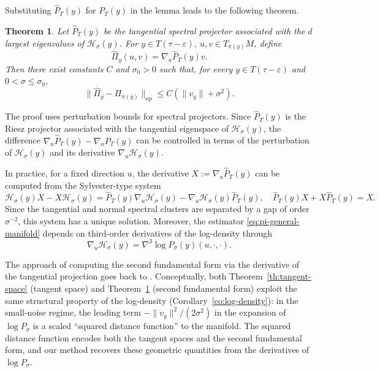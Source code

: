 \documentclass[11pt]{article}
\theoremstyle{plain}
\newtheorem{theorem}{Theorem}[section]
\theoremstyle{definition}
\begin{document}
Substituting $\widehat{P}_T(y)$ for $P_T(y)$ in the lemma leads to the following theorem.
\begin{theorem}\label{th:general-manifold}
Let $\widehat P_T(y)$ be the tangential spectral projector associated with the $d$ largest eigenvalues of $\mathcal H_\sigma(y)$. For $y\in T(\tau-\varepsilon),\ u,v\in T_{\pi(y)}M$, define
\begin{equation}\label{eq:pi-general-manifold}
\widehat{\Pi}_y(u,v) = \nabla_{u} \widehat{P}_T(y) v.
\end{equation}
Then there exist constants $C$ and $\sigma_0>0$ such that, for every $y\in T(\tau-\varepsilon)$ and $0<\sigma\le\sigma_0$,
\[
\|\widehat{\Pi}_y-\Pi_{\pi(y)}\|_{\mathrm{op}} \le C(\|v_y\|+\sigma^2).
\]
\end{theorem}
The proof uses perturbation bounds for spectral projectors. Since $\widehat P_T(y)$ is the Riesz projector associated with the tangential eigenspace of $\mathcal H_\sigma(y)$, the difference $\nabla_u\widehat P_T(y)-\nabla_u P_T(y)$ can be controlled in terms of the perturbation of $\mathcal H_\sigma(y)$ and its derivative $\nabla_u\mathcal H_\sigma(y)$.

In practice, for a fixed direction $u$, the derivative
$X:=\nabla_u\widehat P_T(y)$ can be computed from the Sylvester-type system
\[
\mathcal H_\sigma(y)X - X\mathcal H_\sigma(y)
=
\widehat P_T(y)\nabla_u\mathcal H_\sigma(y)
-
\nabla_u\mathcal H_\sigma(y)\widehat P_T(y),\quad \widehat P_T(y)X + X\widehat P_T(y)=X.
\]
Since the tangential and normal spectral clusters are
separated by a gap of order $\sigma^{-2}$, this system has a unique solution.
Moreover, the estimator \eqref{eq:pi-general-manifold} depends on third-order derivatives of the log-density through
\[
\nabla_u\mathcal H_\sigma(y)=\nabla^3 \log P_\sigma(y)(u,\cdot,\cdot).
\]

The approach of computing the second fundamental form via the derivative of the tangential projection goes back to \citet{Hutchinson1986, Ambrosio1998CurvatureAD}. Conceptually, both Theorem~\ref{th:tangent-space} (tangent space) and Theorem~\ref{th:general-manifold} (second fundamental form) exploit the same structural property of the log-density (Corollary~\ref{co:log-density}): in the small-noise regime, the leading term $-{\|v_y\|^2}/{(2\sigma^2)}$ in the expansion of $\log P_\sigma$ is a scaled ``squared distance function'' to the manifold. The squared distance function encodes both the tangent spaces and the second fundamental form, and our method recovers these geometric quantities from the derivatives of $\log P_\sigma$.
 
\end{document}
